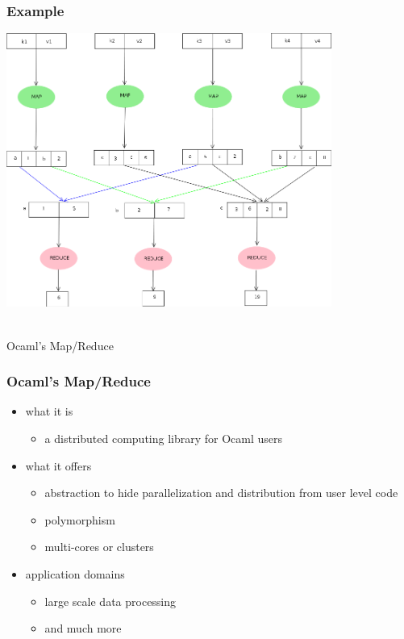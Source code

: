 \documentclass{beamer}
\let\emph\alert
\begin{document}
\begin{frame}\frametitle{Example}
  \begin{center}
    \includegraphics[width=0.8\textwidth]{mr-new}
  \end{center}
\end{frame}

\begin{frame}
  \begin{center}
    \hrulefill\\
    \emph{Ocaml's Map/Reduce}
  \end{center}
\end{frame}

\begin{frame}\frametitle{Ocaml's Map/Reduce}
  \begin{itemize}
  \item 
    what it is
    \begin{itemize}
    \item a distributed computing library for Ocaml users
    \end{itemize}

    \bigskip
  \item 
    what it offers
    \begin{itemize}
    \item abstraction to hide parallelization and distribution from
      user level code
    \item \emph{polymorphism}
    \item \emph{multi-cores or clusters}
    \end{itemize}

    \bigskip
  \item 
    application domains
    \begin{itemize}
    \item large scale data processing
    \item \emph{and much more}
    \end{itemize}
  \end{itemize}
\end{frame}
\end{document}
